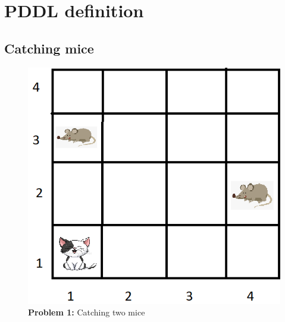 \section{PDDL definition}

\subsection{Catching mice}



\begin{multicols}{2}

\begin{figure}[H]
    \centering
    \includegraphics[width=\linewidth]{fig/A3/cat_01.png}
    \caption{\textbf{Problem 1:} Catching two mice}
    \label{fig:cat_01}
\end{figure}

\columnbreak


\end{multicols}
